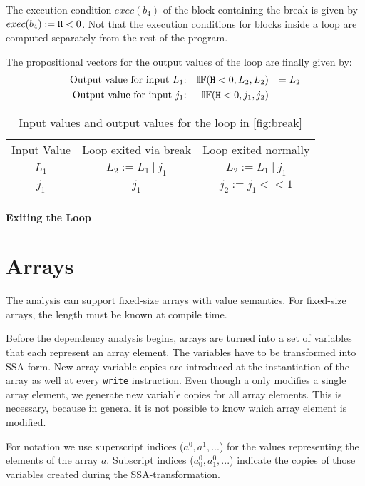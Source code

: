 The execution condition $exec(b_4)$ of the block containing the break is given by $exec(b_4) := \mathtt{H} < 0$. Not that the execution conditions for blocks inside a loop are computed separately from the rest of the program.

The propositional vectors for the output values of the loop are finally given by:
\begin{align*}
    \text{Output value for input $L_1$:} && \mathbb{IF}(\mathtt{H} < 0 , L_2 , L_2) && = L_2 \\
    \text{Output value for input $j_1$:} && \mathbb{IF}(\mathtt{H} < 0 , j_1, j_2)\\
\end{align*}

\begin{table}[]
    \centering
    \begin{tabular}{|c|c|c|}
     Input Value &  Loop exited via break & Loop exited normally \\
        $L_1$ & $L_2 := L_1 \: | \: j_1$ & $L_2 := L_1 \: | \: j_1$ \\
        $j_1$ & $j_1$ & $j_2 := j_1 << 1$
\end{tabular}
    \caption{Input values and output values for the loop in \ref{fig:break}}
    \label{tab:break}
\end{table}

\paragraph{Exiting the Loop}




\section{Arrays}
The analysis can support fixed-size arrays with value semantics. For fixed-size arrays, the length must be known at compile time.

Before the dependency analysis begins, arrays are turned into a set of variables that each represent an array element. The variables have to be transformed into SSA-form. New array variable copies are introduced at the instantiation of the array as well at every \texttt{write} instruction. Even though a only modifies a single array element, we generate new variable copies for all array elements. This is necessary, because in general it is not possible to know which array element is modified.

For notation we use superscript indices ($a^0, a^1, ...$) for the values representing the elements of the array $a$. Subscript indices ($a^0_0, a^0_1,...$) indicate the copies of those variables created during the SSA-transformation.


